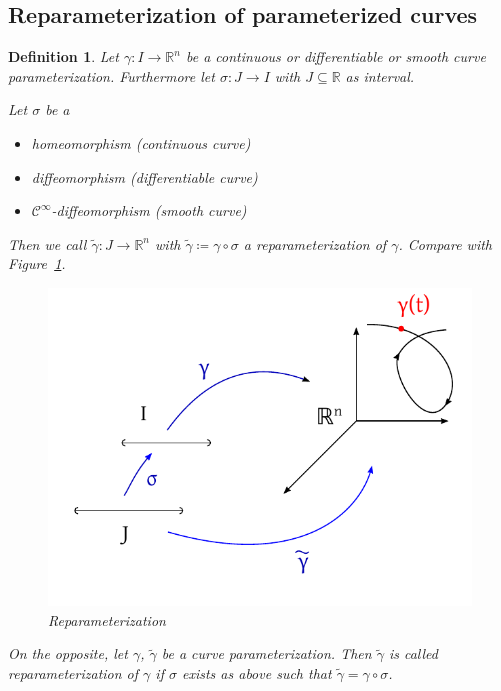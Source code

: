\documentclass{article}
\newtheorem{definition}{Definition}  \numberwithin{definition}{section}
\begin{document}
\subsection{Reparameterization of parameterized curves}
\begin{definition} %
  Let $\gamma: I \to \mathbb R^n$ be a continuous or differentiable or smooth curve parameterization.
  Furthermore let $\sigma: J \to I$ with $J \subseteq \mathbb R$ as interval.

  Let $\sigma$ be a
  \begin{itemize}
    \item homeomorphism (continuous curve)
    \item diffeomorphism (differentiable curve)
    \item $\mathcal C^\infty$-diffeomorphism (smooth curve)
  \end{itemize}
  Then we call $\tilde \gamma: J \to \mathbb R^n$ with $\tilde \gamma \coloneqq \gamma \circ \sigma$ a \emph{reparameterization} of $\gamma$.
  Compare with Figure~\ref{img:reparam}.

  \begin{figure}[t]
    \begin{center}
      \includegraphics{img/40_reparameterization.pdf}
      \caption{Reparameterization}
      \label{img:reparam}
    \end{center}
  \end{figure}

  On the opposite, let $\gamma$, $\tilde \gamma$ be a curve parameterization. Then $\tilde\gamma$ is called reparameterization of $\gamma$ if $\sigma$ exists as above such that $\tilde \gamma = \gamma \circ \sigma$.
\end{definition}
\end{document}
